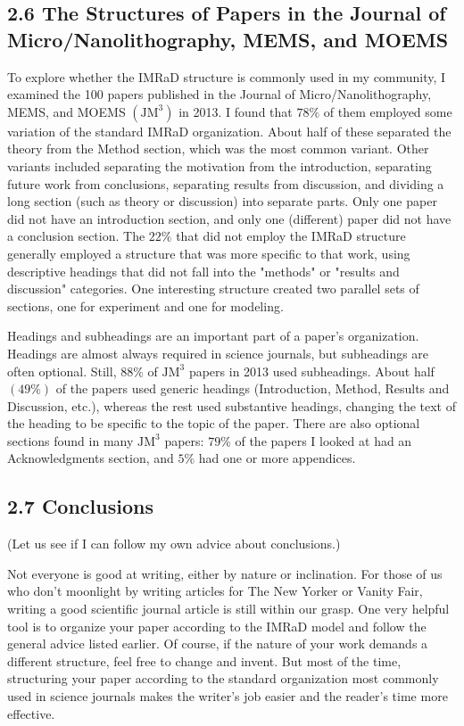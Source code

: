 \subsection*{2.6 The Structures of Papers in the Journal of Micro/Nanolithography, MEMS, and MOEMS}
To explore whether the IMRaD structure is commonly used in my community, I examined the 100 papers published in the Journal of Micro/Nanolithography, MEMS, and MOEMS $\left(\mathrm{JM}^{3}\right)$ in 2013. I found that $78 \%$ of them employed some variation of the standard IMRaD organization. About half of these separated the theory from the Method section, which was the most common variant. Other variants included separating the motivation from the introduction, separating future work from conclusions, separating results from discussion, and dividing a long section (such as theory or discussion) into separate parts. Only one paper did not have an introduction section, and only one (different) paper did not have a conclusion section. The $22 \%$ that did not employ the IMRaD structure generally employed a structure that was more specific to that work, using descriptive headings that did not fall into the "methods" or "results and discussion" categories. One interesting structure created two parallel sets of sections, one for experiment and one for modeling.

Headings and subheadings are an important part of a paper's organization. Headings are almost always required in science journals, but subheadings are often optional. Still, $88 \%$ of $\mathrm{JM}^{3}$ papers in 2013 used subheadings. About half $(49 \%)$ of the papers used generic headings (Introduction, Method, Results and Discussion, etc.), whereas the rest used substantive headings, changing the text of the heading to be specific to the topic of the paper. There are also optional sections found in many $\mathrm{JM}^{3}$ papers: $79 \%$ of the papers I looked at had an Acknowledgments section, and $5 \%$ had one or more appendices.

\subsection*{2.7 Conclusions}
(Let us see if I can follow my own advice about conclusions.)

Not everyone is good at writing, either by nature or inclination. For those of us who don't moonlight by writing articles for The New Yorker or Vanity Fair, writing a good scientific journal article is still within our grasp. One very helpful tool is to organize your paper according to the IMRaD model and follow the general advice listed earlier. Of course, if the nature of your work demands a different structure, feel free to change and invent. But most of the time, structuring your paper according to the standard organization most commonly used in science journals makes the writer's job easier and the reader's time more effective.

